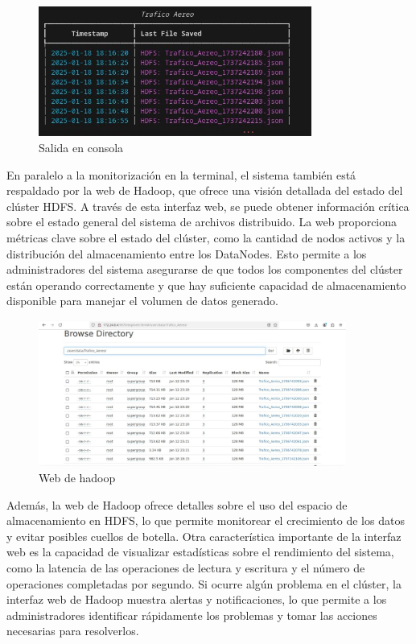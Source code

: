 \documentclass{article}
\begin{document}
\begin{figure}[h]
    \centering
    \includegraphics[width=0.8\textwidth]{terminal_output.jpg}
    \caption{Salida en consola}
\end{figure}

En paralelo a la monitorización en la terminal, el sistema también está respaldado por la web de Hadoop, que ofrece una visión detallada del estado del clúster HDFS. A través de esta interfaz web, se puede obtener información crítica sobre el estado general del sistema de archivos distribuido. La web proporciona métricas clave sobre el estado del clúster, como la cantidad de nodos activos y la distribución del almacenamiento entre los DataNodes. Esto permite a los administradores del sistema asegurarse de que todos los componentes del clúster están operando correctamente y que hay suficiente capacidad de almacenamiento disponible para manejar el volumen de datos generado.
\begin{figure}[h]
    \centering
    \includegraphics[width=0.9\textwidth]{HDFS_web.jpg}
    \caption{Web de hadoop}
\end{figure}

Además, la web de Hadoop ofrece detalles sobre el uso del espacio de almacenamiento en HDFS, lo que permite monitorear el crecimiento de los datos y evitar posibles cuellos de botella. Otra característica importante de la interfaz web es la capacidad de visualizar estadísticas sobre el rendimiento del sistema, como la latencia de las operaciones de lectura y escritura y el número de operaciones completadas por segundo.
Si ocurre algún problema en el clúster, la interfaz web de Hadoop muestra alertas y notificaciones, lo que permite a los administradores identificar rápidamente los problemas y tomar las acciones necesarias para resolverlos.
\end{document}
